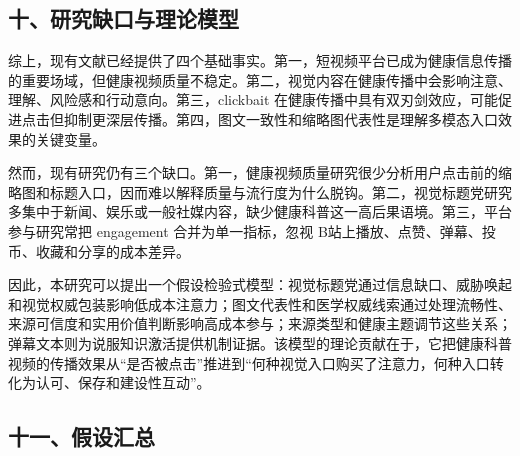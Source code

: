 \documentclass[
  12pt,
]{article}
\begin{document}
\subsection{十、研究缺口与理论模型}\label{ux5341ux7814ux7a76ux7f3aux53e3ux4e0eux7406ux8bbaux6a21ux578b}

综上，现有文献已经提供了四个基础事实。第一，短视频平台已成为健康信息传播的重要场域，但健康视频质量不稳定。第二，视觉内容在健康传播中会影响注意、理解、风险感和行动意向。第三，clickbait
在健康传播中具有双刃剑效应，可能促进点击但抑制更深层传播。第四，图文一致性和缩略图代表性是理解多模态入口效果的关键变量。

然而，现有研究仍有三个缺口。第一，健康视频质量研究很少分析用户点击前的缩略图和标题入口，因而难以解释质量与流行度为什么脱钩。第二，视觉标题党研究多集中于新闻、娱乐或一般社媒内容，缺少健康科普这一高后果语境。第三，平台参与研究常把
engagement 合并为单一指标，忽视
B站上播放、点赞、弹幕、投币、收藏和分享的成本差异。

因此，本研究可以提出一个假设检验式模型：视觉标题党通过信息缺口、威胁唤起和视觉权威包装影响低成本注意力；图文代表性和医学权威线索通过处理流畅性、来源可信度和实用价值判断影响高成本参与；来源类型和健康主题调节这些关系；弹幕文本则为说服知识激活提供机制证据。该模型的理论贡献在于，它把健康科普视频的传播效果从``是否被点击''推进到``何种视觉入口购买了注意力，何种入口转化为认可、保存和建设性互动''。

\subsection{十一、假设汇总}\label{ux5341ux4e00ux5047ux8bbeux6c47ux603b}
\end{document}
